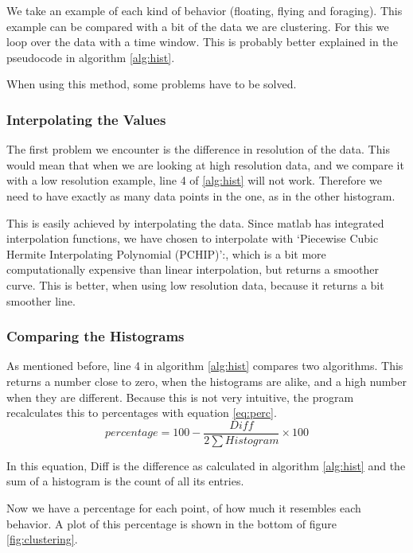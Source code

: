 We take an example of each kind of behavior (floating, flying and foraging).
This example can be compared with a bit of the data we are
clustering. For this we loop over the data with a time window. This is probably
better explained in the pseudocode in algorithm \ref{alg:hist}.

When using this method, some problems have to be solved.

\subsubsection{Interpolating the Values}
The first problem we encounter is the difference in resolution of the data. This
would mean that when we are looking at high resolution data, and we compare it
with a low resolution example, line 4 of \ref{alg:hist} will not work. Therefore
we need to have exactly as many data points in the one, as in the other
histogram. 

This is easily achieved by interpolating the data. Since matlab has integrated
interpolation functions, we have chosen to interpolate with `Piecewise Cubic
Hermite Interpolating Polynomial (PCHIP)':, which is a bit more computationally
expensive than linear interpolation, but returns a smoother curve. This is
better, when using low resolution data, because it returns a bit smoother line.

\subsubsection{Comparing the Histograms}
As mentioned before, line 4 in algorithm \ref{alg:hist} compares two algorithms.
This returns a number close to zero, when the histograms are alike, and a high
number when they are different. Because this is not very intuitive, the program
recalculates this to percentages with equation \ref{eq:perc}.
\begin{equation}
\label{eq:perc}
percentage = 100 - \frac{Diff}{2 \sum Histogram} \times 100
\end{equation}

In this equation, Diff is the difference as calculated in algorithm
\ref{alg:hist} and the sum of a histogram is the count of all its entries. 

Now we have a percentage for each point, of how much it resembles each behavior.
A plot of this percentage is shown in the bottom of figure \ref{fig:clustering}.

